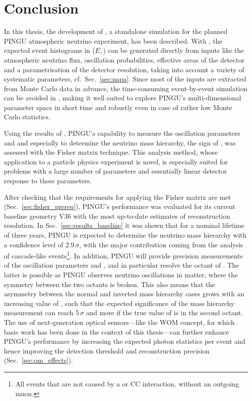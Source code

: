 \chapter{Conclusion}
\label{sec:conclusion}

In this thesis, the development of \papa, a standalone simulation for the
planned PINGU atmospheric neutrino experiment, has been described. With \papa,
the expected event histograms in ($E$,\,\coszen) can be generated directly from
inputs like the atmospheric neutrino flux, oscillation probabilities, effective 
areas of the detector
and a parametrisation of the detector resolution, taking into account a variety
of systematic parameters, cf.\ Sec.~\ref{sec:papa}. Since most of the inputs are
extracted from Monte Carlo data in advance, the time-consuming event-by-event
simulation can be avoided in \papa, making it well suited to explore PINGU's
multi-dimensional parameter space in short time and robustly even in case of
rather low Monte Carlo statistics.

Using the results of \papa, PINGU's capability to measure the oscillation
parameters  and  and especially to determine the neutrino mass
hierarchy, \ie the sign of , was assessed with the Fisher matrix
technique. This analysis method, whose application to a particle physics
experiment is novel, is especially suited for problems with a large number of
parameters and essentially linear detector response to these parameters.

After checking that the requirements for applying the Fisher matrix are met
(Sec.~\ref{sec:fisher_prereq}), PINGU's performance was evaluated for its
current baseline geometry V36 with the most up-to-date estimates of
reconstruction resolution. In Sec.~\ref{sec:results_baseline} it was shown
that for a nominal lifetime of three years, PINGU is expected to determine the
neutrino mass hierarchy with a confidence level of 2.9\,$\sigma$, with the major
contribution coming from the analysis of cascade-like events\footnote{All events
that are not caused by a \numu or \numubar CC interaction, \ie without an
outgoing muon.}. In addition, PINGU will provide precision measurements of the
oscillation parameters  and , and in particular resolve the
octant of . The latter is possible as PINGU observes neutrino
oscillations in matter, where the symmetry between the two octants is broken.
This also means that the asymmetry between the normal and inverted mass
hierarchy cases grows with an increasing value of , such that the
expected significance of the mass hierarchy measurement can reach 5\,$\sigma$
and more if the true value of  is in the second octant.
The use of next-generation optical sensors---like the WOM concept, for which
basic work has been done in the context of this thesis---can further enhance
PINGU's performance by increasing the expected photon statistics per event and
hence improving the detection threshold and reconstruction precision
(Sec.~\ref{sec:om_effects}).

